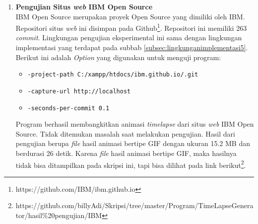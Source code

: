 \begin{enumerate}


\item \textbf{Pengujian Situs \textit{web} IBM Open Source}\\
IBM Open Source merupakan proyek Open Source yang dimiliki oleh IBM. Repositori situs \textit{web} ini disimpan pada Github\footnote{https://github.com/IBM/ibm.github.io}. Repositori ini memiliki 263 \textit{commit}. Lingkungan pengujian eksperimental ini sama dengan lingkungan implementasi yang terdapat pada subbab \ref{subsec:lingkunganimplementasi5}. Berikut ini adalah \textit{Option} yang digunakan untuk menguji program:
\begin{itemize}
\item \texttt{-project-path C:/xampp/htdocs/ibm.github.io/.git}
\item \texttt{-capture-url http://localhost}
\item \texttt{-seconds-per-commit 0.1} 
\end{itemize}
Program berhasil membangkitkan animasi \textit{timelapse} dari situs \textit{web} IBM Open Source. Tidak ditemukan masalah saat melakukan pengujian. Hasil dari pengujian berupa \textit{file} hasil animasi bertipe GIF dengan ukuran 15.2 MB dan berdurasi 26 detik. Karena \textit{file} hasil animasi bertipe GIF, maka hasilnya tidak bisa ditampilkan pada skripsi ini, tapi bisa dilihat pada link berikut\footnote{https://github.com/billyAdi/Skripsi/tree/master/Program/TimeLapseGenerator/hasil\%20pengujian/IBM}.


\end{enumerate}
